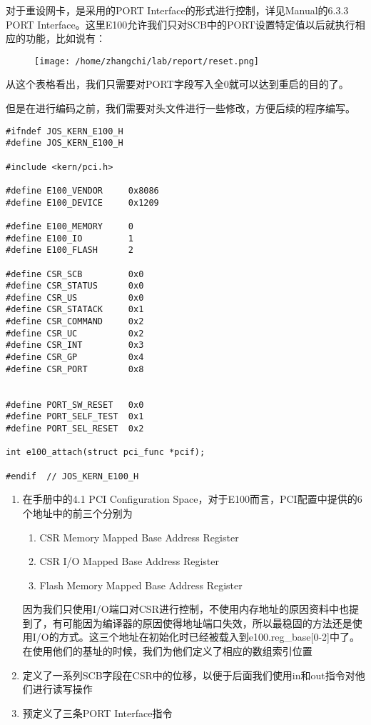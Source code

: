 \documentclass{article}
\begin{document}
\begin{CJK*}{UTF8}{gkai}
对于重设网卡，是采用的PORT Interface的形式进行控制，详见Manual的6.3.3 PORT Interface。这里E100允许我们只对SCB中的PORT设置特定值以后就执行相应的功能，比如说有：


\begin{figure}[htp]
\centering
\texttt{[image: /home/zhangchi/lab/report/reset.png]}
\end{figure}

从这个表格看出，我们只需要对PORT字段写入全0就可以达到重启的目的了。

但是在进行编码之前，我们需要对头文件进行一些修改，方便后续的程序编写。

\begin{lstlisting}[style=ccode, title={\scriptsize \ttfamily \bfseries kern/e1000.h}]
#ifndef JOS_KERN_E100_H
#define JOS_KERN_E100_H

#include <kern/pci.h>

#define E100_VENDOR		0x8086
#define E100_DEVICE		0x1209

#define E100_MEMORY     0
#define E100_IO         1
#define E100_FLASH      2

#define CSR_SCB         0x0
#define CSR_STATUS      0x0
#define CSR_US          0x0
#define CSR_STATACK     0x1
#define CSR_COMMAND     0x2
#define CSR_UC          0x2
#define CSR_INT         0x3
#define CSR_GP          0x4
#define CSR_PORT        0x8


#define PORT_SW_RESET   0x0
#define PORT_SELF_TEST  0x1
#define PORT_SEL_RESET  0x2

int e100_attach(struct pci_func *pcif);

#endif	// JOS_KERN_E100_H
\end{lstlisting}


\begin{enumerate}
\item{在手册中的4.1 PCI Configuration Space，对于E100而言，PCI配置中提供的6个地址中的前三个分别为

\begin{enumerate}
\item{CSR Memory Mapped Base Address Register}
\item{CSR I/O Mapped Base Address Register}
\item{Flash Memory Mapped Base Address Register}
\end{enumerate}

因为我们只使用I/O端口对CSR进行控制，不使用内存地址的原因资料中也提到了，有可能因为编译器的原因使得地址端口失效，所以最稳固的方法还是使用I/O的方式。这三个地址在初始化时已经被载入到e100.reg\_base[0-2]中了。在使用他们的基址的时候，我们为他们定义了相应的数组索引位置
}
\item{定义了一系列SCB字段在CSR中的位移，以便于后面我们使用in和out指令对他们进行读写操作}
\item{预定义了三条PORT Interface指令}
\end{enumerate}


\end{CJK*}
\end{document}

